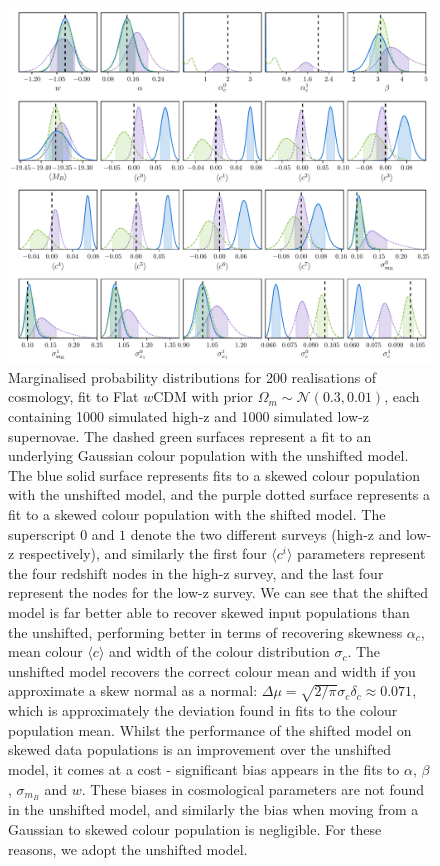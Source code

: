 \documentclass[a4paper,fleqn,usenatbib]{mnras}
\begin{document}
\begin{figure}
	\begin{center}
		\includegraphics[width=\textwidth]{simple_w_super_dist.pdf}
	\end{center}
	\caption{Marginalised probability distributions for 200 realisations of cosmology, fit to Flat $w$CDM with prior $\Omega_m \sim \mathcal{N}(0.3, 0.01)$, each containing 1000 simulated high-z and 1000 simulated low-z supernovae. The dashed green surfaces represent a fit to an underlying Gaussian colour population with the unshifted model. The blue solid surface represents fits to a skewed colour population with the unshifted model, and the purple dotted surface represents a fit to a skewed colour population with the shifted model. The superscript $0$ and $1$ denote the two different surveys (high-z and low-z respectively), and similarly the first four $\langle c^i \rangle$ parameters represent the four redshift nodes in the high-z survey, and the last four represent the nodes for the low-z survey. We can see that the shifted model is far better able to recover skewed input populations than the unshifted, performing better in terms of recovering skewness $\alpha_c$, mean colour $\langle c \rangle$ and width of the colour distribution $\sigma_c$. The unshifted model recovers the correct colour mean and width if you approximate a skew normal as a normal: $\Delta\mu = \sqrt{2/\pi}\sigma_c\delta_c \approx 0.071$, which is approximately the deviation found in fits to the colour population mean. Whilst the performance of the shifted model on skewed data populations is an improvement over the unshifted model, it comes at a cost - significant bias appears in the fits to $\alpha$, $\beta$, $\sigma_{m_B}$ and $w$. These biases in cosmological parameters are not found in the unshifted model, and similarly the bias when moving from a Gaussian to skewed colour population is negligible. For these reasons, we adopt the unshifted model.}
	\label{fig:simple_w_super}
\end{figure}





\bsp	%
\label{lastpage}
\end{document}

